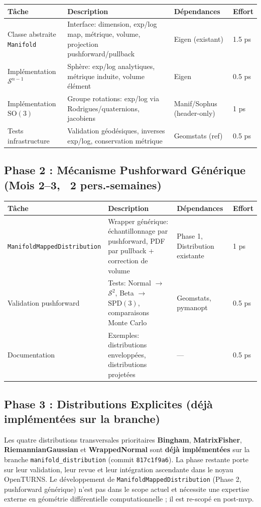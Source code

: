 \documentclass[11pt,a4paper]{article}
\begin{document}
\begin{longtable}{@{}p{4cm}p{3.5cm}p{3.5cm}p{2.5cm}@{}}
\toprule
\textbf{Tâche} & \textbf{Description} & \textbf{Dépendances} & \textbf{Effort} \\
\midrule
Classe abstraite \texttt{Manifold} & Interface: dimension, exp/log map, métrique, volume, projection pushforward/pullback & Eigen (existant) & 1.5 ps \\
Implémentation $\mathcal{S}^{n-1}$ & Sphère: exp/log analytiques, métrique induite, volume élément & Eigen & 0.5 ps \\
Implémentation $\text{SO}(3)$ & Groupe rotations: exp/log via Rodrigues/quaternions, jacobiens & Manif/Sophus (header-only) & 1 ps \\
Tests infrastructure & Validation géodésiques, inverses exp/log, conservation métrique & Geomstats (ref) & 0.5 ps \\
\bottomrule
\end{longtable}

\subsection{Phase 2 : Mécanisme Pushforward Générique (Mois 2--3, ~2 pers.-semaines)}

\begin{longtable}{@{}p{4cm}p{3.5cm}p{3.5cm}p{2.5cm}@{}}
\toprule
\textbf{Tâche} & \textbf{Description} & \textbf{Dépendances} & \textbf{Effort} \\
\midrule
\texttt{Manifold\-Mapped\-Distribution} & Wrapper générique: échantillonnage par pushforward, PDF par pullback + correction de volume & Phase 1, Distribution existante & 1 ps \\
Validation pushforward & Tests: Normal $\to$ $\mathcal{S}^2$, Beta $\to$ $\text{SPD}(3)$, comparaisons Monte Carlo & Geomstats, pymanopt & 0.5 ps \\
Documentation & Exemples: distributions enveloppées, distributions projetées & — & 0.5 ps \\
\bottomrule
\end{longtable}

\subsection{Phase 3 : Distributions Explicites (déjà implémentées sur la branche)}

Les quatre distributions transversales prioritaires \textbf{Bingham}, \textbf{Matrix\-Fisher}, \textbf{Riemann\-ian\-Gaussian} et \textbf{Wrapped\-Normal} sont \textbf{déjà implémentées} sur la branche \texttt{manifold\_\discretionary{-}{}{}distribution} (commit \texttt{817c1f9a6}). La phase restante porte sur leur validation, leur revue et leur intégration ascendante dans le noyau OpenTURNS. Le développement de \texttt{ManifoldMappedDistribution} (Phase 2, pushforward générique) n'est pas dans le scope actuel et nécessite une expertise externe en géométrie différentielle computationnelle ; il est re-scopé en post-mvp.
\end{document}
